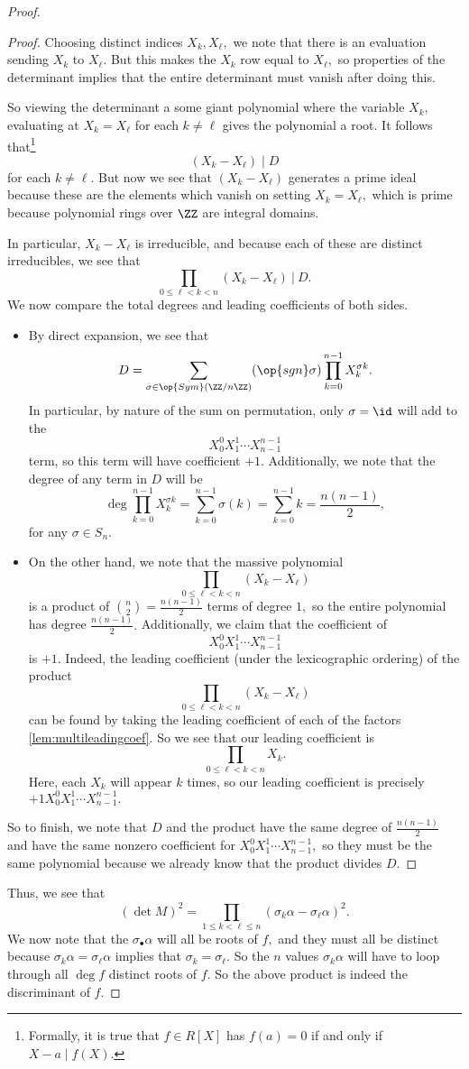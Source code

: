 \begin{proof}
\begin{proof}
		Choosing distinct indices $X_k,X_\ell,$ we note that there is an evaluation sending $X_k$ to $X_\ell.$ But this makes the $X_k$ row equal to $X_\ell,$ so properties of the determinant implies that the entire determinant must vanish after doing this.
	
		So viewing the determinant a some giant polynomial where the variable $X_k,$ evaluating at $X_k=X_\ell$ for each $k\ne\ell$ gives the polynomial a root. It follows that\footnote{Formally, it is true that $f\in R[X]$ has $f(a)=0$ if and only if $X-a\mid f(X).$}
		\[(X_k-X_\ell)\mid D\]
		for each $k\ne\ell.$ But now we see that $(X_k-X_\ell)$ generates a prime ideal because these are the elements which vanish on setting $X_k=X_\ell,$ which is prime because polynomial rings over $\ZZ$ are integral domains.
		
		In particular, $X_k-X_\ell$ is irreducible, and because each of these are distinct irreducibles, we see that
		\[\prod_{0\le \ell<k< n}(X_k-X_\ell)~\bigg|~D.\]
		We now compare the total degrees and leading coefficients of both sides.
		\begin{itemize}
			\item By direct expansion, we see that
			\[D=\sum_{\sigma\in\op{Sym}(\ZZ/n\ZZ)}(\op{sgn}\sigma)\prod_{k=0}^{n-1}X_k^{\sigma k}.\]
			In particular, by nature of the sum on permutation, only $\sigma=\id$ will add to the
			\[X_0^0X_1^1\cdots X_{n-1}^{n-1}\]
			term, so this term will have coefficient $+1.$ Additionally, we note that the degree of any term in $D$ will be
			\[\deg\prod_{k=0}^{n-1}X_k^{\sigma k}=\sum_{k=0}^{n-1}\sigma(k)=\sum_{k=0}^{n-1}k=\frac{n(n-1)}2,\]
			for any $\sigma\in S_n.$
			\item On the other hand, we note that the massive polynomial
			\[\prod_{0\le \ell<k< n}(X_k-X_\ell)\]
			is a product of $\binom n2=\frac{n(n-1)}2$ terms of degree $1,$ so the entire polynomial has degree $\frac{n(n-1)}2.$ Additionally, we claim that the coefficient of
			\[X_0^0X_1^1\cdots X_{n-1}^{n-1}\]
			is $+1.$ Indeed, the leading coefficient (under the lexicographic ordering) of the product
			\[\prod_{0\le \ell<k< n}(X_k-X_\ell)\]
			can be found by taking the leading coefficient of each of the factors \autoref{lem:multileadingcoef}. So we see that our leading coefficient is
			\[\prod_{0\le \ell<k< n}X_k.\]
			Here, each $X_k$ will appear $k$ times, so our leading coefficient is precisely $+1X_0^0X_1^1\cdots X_{n-1}^{n-1}.$
		\end{itemize}
		So to finish, we note that $D$ and the product have the same degree of $\frac{n(n-1)}2$ and have the same nonzero coefficient for $X_0^0X_1^1\cdots X_{n-1}^{n-1},$ so they must be the same polynomial because we already know that the product divides $D.$
	\end{proof}
	Thus, we see that
	\[(\det M)^2=\prod_{1\le k<\ell\le n}(\sigma_k\alpha-\sigma_\ell\alpha)^2.\]
	We now note that the $\sigma_\bullet\alpha$ will all be roots of $f,$ and they must all be distinct because $\sigma_k\alpha=\sigma_\ell\alpha$ implies that $\sigma_k=\sigma_\ell.$ So the $n$ values $\sigma_k\alpha$ will have to loop through all $\deg f$ distinct roots of $f.$ So the above product is indeed the discriminant of $f.$
\end{proof}

